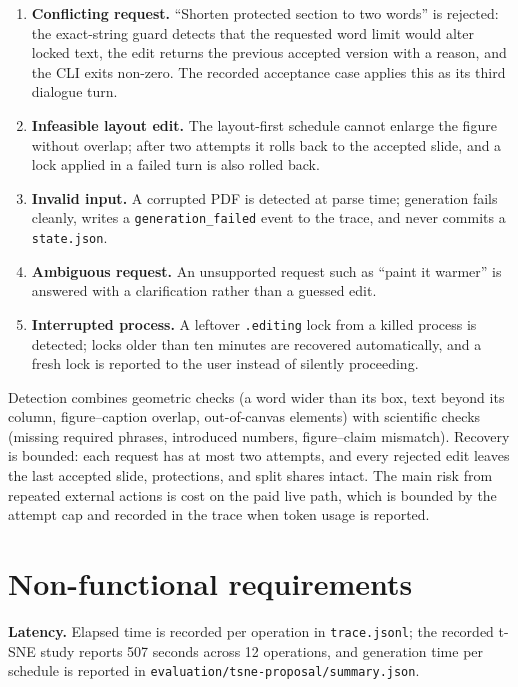 \documentclass{article}
\begin{document}
\begin{enumerate}
  \item \textbf{Conflicting request.} ``Shorten protected section to two words'' is rejected: the exact-string guard detects that the requested word limit would alter locked text, the edit returns the previous accepted version with a reason, and the CLI exits non-zero. The recorded acceptance case applies this as its third dialogue turn.
  \item \textbf{Infeasible layout edit.} The layout-first schedule cannot enlarge the figure without overlap; after two attempts it rolls back to the accepted slide, and a lock applied in a failed turn is also rolled back.
  \item \textbf{Invalid input.} A corrupted PDF is detected at parse time; generation fails cleanly, writes a \texttt{generation\_failed} event to the trace, and never commits a \texttt{state.json}.
  \item \textbf{Ambiguous request.} An unsupported request such as ``paint it warmer'' is answered with a clarification rather than a guessed edit.
  \item \textbf{Interrupted process.} A leftover \texttt{.editing} lock from a killed process is detected; locks older than ten minutes are recovered automatically, and a fresh lock is reported to the user instead of silently proceeding.
\end{enumerate}

Detection combines geometric checks (a word wider than its box, text beyond its column, figure--caption overlap, out-of-canvas elements) with scientific checks (missing required phrases, introduced numbers, figure--claim mismatch). Recovery is bounded: each request has at most two attempts, and every rejected edit leaves the last accepted slide, protections, and split shares intact. The main risk from repeated external actions is cost on the paid live path, which is bounded by the attempt cap and recorded in the trace when token usage is reported.

\section{Non-functional requirements}

\textbf{Latency.} Elapsed time is recorded per operation in \texttt{trace.jsonl}; the recorded t-SNE study reports 507 seconds across 12 operations, and generation time per schedule is reported in \texttt{evaluation/tsne-proposal/summary.json}.
\end{document}
